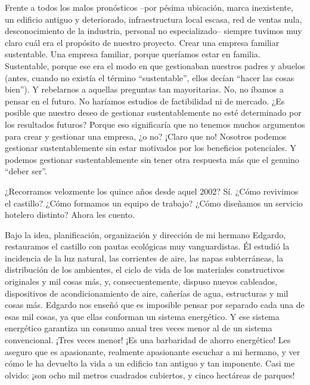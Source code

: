 Frente a todos los malos pronósticos --por pésima ubicación, marca
inexistente, un edificio antiguo y deteriorado, infraestructura local
escasa, red de ventas nula, desconocimiento de la industria, personal no
especializado-- siempre tuvimos muy claro cuál era el propósito de
nuestro proyecto. Crear una empresa familiar sustentable. Una empresa
familiar, porque queríamos estar en familia. Sustentable, porque ese era
el modo en que gestionaban nuestros padres y abuelos (antes, cuando no
existía el término ``sustentable'', ellos decían ``hacer las cosas
bien''). Y rebelarnos a aquellas preguntas tan mayoritarias. No, no
íbamos a pensar en el futuro. No haríamos estudios de factibilidad ni de
mercado. ¿Es posible que nuestro deseo de gestionar sustentablemente no
esté determinado por los resultados futuros? Porque eso significaría que
no tenemos muchos argumentos para crear y gestionar una empresa, ¿o no?
¡Claro que no! Nosotros podemos gestionar sustentablemente sin estar
motivados por los beneficios potenciales. Y podemos gestionar
sustentablemente sin tener otra respuesta más que el genuino ``deber
ser''.

¿Recorramos velozmente los quince años desde aquel 2002? Sí. ¿Cómo
revivimos el castillo? ¿Cómo formamos un equipo de trabajo? ¿Cómo
diseñamos un servicio hotelero distinto? Ahora les cuento.

Bajo la idea, planificación, organización y dirección de mi hermano
Edgardo, restauramos el castillo con pautas ecológicas muy
vanguardistas. Él estudió la incidencia de la luz natural, las
corrientes de aire, las napas subterráneas, la distribución de los
ambientes, el ciclo de vida de los materiales constructivos originales y
mil cosas más, y, consecuentemente, dispuso nuevos cableados,
dispositivos de acondicionamiento de aire, cañerías de agua, estructuras
y mil cosas más. Edgardo nos enseñó que es imposible pensar por separado
cada una de esas mil cosas, ya que ellas conforman un sistema
energético. Y ese sistema energético garantiza un consumo anual tres
veces menor al de un sistema convencional. ¡Tres veces menor! ¡Es una
barbaridad de ahorro energético! Les aseguro que es apasionante,
realmente apasionante escuchar a mi hermano, y ver cómo le ha devuelto
la vida a un edificio tan antiguo y tan imponente. Casi me olvido: ¡son
ocho mil metros cuadrados cubiertos, y cinco hectáreas de parques!

